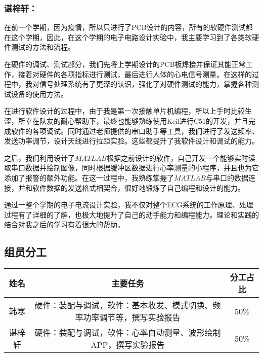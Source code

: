 \documentclass{zjureport}
\begin{document}
	\subsubsection{谌梓轩：}
	
	在前一个学期，因为疫情，所以只进行了PCB设计的内容，所有的软硬件测试都在这个学期，因此，在这个学期的电子电路设计实验中，我主要学习到了各类软硬件测试的方法和流程。
	
	在硬件的调试、测试部分，我们先将上学期设计的PCB板焊接并保证其能正常工作，接着对硬件的各项指标进行测试，最后进行人体的心电信号测量。在这样的过程中，我对信号处理系统有了更深的认识，强化了对硬件测试的能力，掌握各种测试设备的使用方法。
	
	在进行软件设计的过程中，由于我是第一次接触单片机编程，所以上手时比较生涩，所幸在队友的耐心帮助下，最终也能够熟练使用Keil进行C51的开发，并且完成软件的各项调试。同时通过老师提供的串口助手等工具，我们进行了发送频率、发送功率调节，设计天线进行拉距实验。这些都提升了我软件设计和调试的能力。
	
	之后，我们利用设计了$MATLAB$根据之前设计的软件，自己开发一个能够实时读取串口数据并绘制图像，同时根据缓冲区数据进行心率测量的小程序，并且也为它添加了报警的额外功能。在这一过程中，我熟练掌握了$MATLAB$与串口的数据连接，并和软件数据的发送格式相契合，很好地锻炼了自己编程和设计的能力。
	
	通过一整个学期的电子电流设计实验，我不仅对整个ECG系统的工作原理、处理过程有了详细的了解，也极大地提升了自己的动手能力和编程能力。理论和实践的结合对我之后的学习有着很大的帮助。
	
	
	
	\subsection{组员分工}
	
	\begin{table}[!ht]
		\centering
		\begin{tabular}{|c|c|c|}
			\hline
			姓名 & 主要任务 & 分工占比 \\ \hline
			韩寒 & 硬件：装配与调试，软件：基本收发、模式切换、频率功率调节等，撰写实验报告& 50\%  \\ \hline
			谌梓轩 & 硬件：装配与调试，软件：心率自动测量、波形绘制APP，撰写实验报告 & 50\%  \\ \hline
			
		\end{tabular}
	\end{table}
	
	
\end{document}
